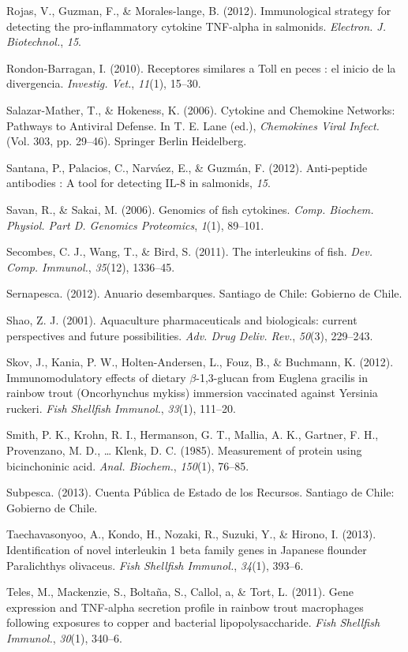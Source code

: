 \documentclass[12pt,a4paper,oneside]{scrbook}
\begin{document}
Rojas, V., Guzman, F., \& Morales-lange, B. (2012). Immunological
strategy for detecting the pro-inflammatory cytokine TNF-alpha in
salmonids. \emph{Electron. J. Biotechnol.}, \emph{15}.

Rondon-Barragan, I. (2010). Receptores similares a Toll en peces : el
inicio de la divergencia. \emph{Investig. Vet.}, \emph{11}(1), 15--30.

Salazar-Mather, T., \& Hokeness, K. (2006). Cytokine and Chemokine
Networks: Pathways to Antiviral Defense. In T. E. Lane (ed.),
\emph{Chemokines Viral Infect.} (Vol. 303, pp. 29--46). Springer Berlin
Heidelberg.

Santana, P., Palacios, C., Narváez, E., \& Guzmán, F. (2012).
Anti-peptide antibodies : A tool for detecting IL-8 in salmonids,
\emph{15}.

Savan, R., \& Sakai, M. (2006). Genomics of fish cytokines. \emph{Comp.
Biochem. Physiol. Part D. Genomics Proteomics}, \emph{1}(1), 89--101.

Secombes, C. J., Wang, T., \& Bird, S. (2011). The interleukins of fish.
\emph{Dev. Comp. Immunol.}, \emph{35}(12), 1336--45.

Sernapesca. (2012). Anuario desembarques. Santiago de Chile: Gobierno de
Chile.

Shao, Z. J. (2001). Aquaculture pharmaceuticals and biologicals: current
perspectives and future possibilities. \emph{Adv. Drug Deliv. Rev.},
\emph{50}(3), 229--243.

Skov, J., Kania, P. W., Holten-Andersen, L., Fouz, B., \& Buchmann, K.
(2012). Immunomodulatory effects of dietary $\beta$-1,3-glucan from
Euglena gracilis in rainbow trout (Oncorhynchus mykiss) immersion
vaccinated against Yersinia ruckeri. \emph{Fish Shellfish Immunol.},
\emph{33}(1), 111--20.

Smith, P. K., Krohn, R. I., Hermanson, G. T., Mallia, A. K., Gartner, F.
H., Provenzano, M. D., \ldots{} Klenk, D. C. (1985). Measurement of
protein using bicinchoninic acid. \emph{Anal. Biochem.}, \emph{150}(1),
76--85.

Subpesca. (2013). Cuenta Pública de Estado de los Recursos. Santiago de
Chile: Gobierno de Chile.

Taechavasonyoo, A., Kondo, H., Nozaki, R., Suzuki, Y., \& Hirono, I.
(2013). Identification of novel interleukin 1 beta family genes in
Japanese flounder Paralichthys olivaceus. \emph{Fish Shellfish
Immunol.}, \emph{34}(1), 393--6.

Teles, M., Mackenzie, S., Boltaña, S., Callol, a, \& Tort, L. (2011).
Gene expression and TNF-alpha secretion profile in rainbow trout
macrophages following exposures to copper and bacterial
lipopolysaccharide. \emph{Fish Shellfish Immunol.}, \emph{30}(1),
340--6.
\end{document}

